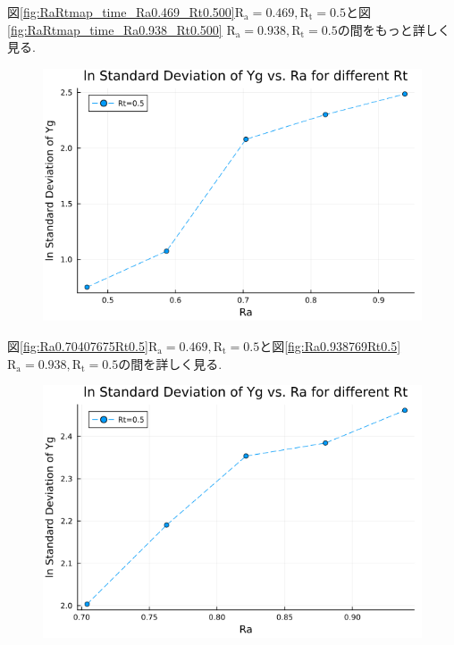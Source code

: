 図\ref{fig:RaRtmap_time_Ra0.469_Rt0.500}$\text{R}_\text{a} = 0.469, \text{R}_\text{t} = 0.5$と図\ref{fig:RaRtmap_time_Ra0.938_Rt0.500} $\text{R}_\text{a} = 0.938, \text{R}_\text{t} = 0.5$の間をもっと詳しく見る.



\begin{figure}[H]
  \centering
  \includegraphics[scale=0.5]{image/lnStdYg_Ra0.4693845to0.98769_Rt0.5_ti25000.png}
  \caption{}
  \label{}
\end{figure}

図\ref{fig:Ra0.70407675Rt0.5}$\text{R}_\text{a} = 0.469, \text{R}_\text{t} = 0.5$と図\ref{fig:Ra0.938769Rt0.5} $\text{R}_\text{a} = 0.938, \text{R}_\text{t} = 0.5$の間を詳しく見る. 



\begin{figure}[H]
  \centering
  \includegraphics[scale=0.5]{image/lnStdYg_Ra0.70407675to0.98769_Rt0.5_ti25000.png}
  \caption{}
  \label{}
\end{figure}

